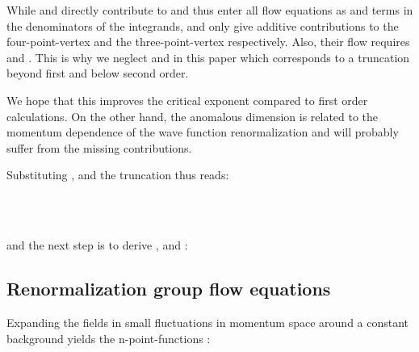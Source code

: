 \documentclass[a4paper,aps,prl,twocolumn,groupedaddress]{revtex4}
\begin{document}
\bigskip
\noindent
While \coordHE{} and \coordHE{} directly contribute to \coordHE{} and thus enter all flow 
equations as \coordHE{} and \coordHE{} terms in the denominators of the integrands, \coordHE{} and \coordHE{}
only give additive contributions to the four-point-vertex and the three-point-vertex respectively. 
Also, their flow requires \coordHE{} and \coordHE{}. 
This is why we neglect \coordHE{} and \coordHE{} in this paper which corresponds to a truncation 
beyond first and below second order.

\bigskip
\noindent
We hope that this improves the critical exponent \myHighlight{$\nu$}\coordHE{} compared to first order calculations.
On the other hand, the anomalous dimension \myHighlight{$\eta$}\coordHE{} is related to the momentum dependence of the
wave function renormalization and will probably suffer from the missing contributions.

\bigskip
\noindent
Substituting \coordHE{}, \coordHE{} and \coordHE{} the 
truncation thus reads:

\bigskip {}\coordHE{}\\
\coordHE{}\\
\coordHE{}

\bigskip
\noindent
and the next step is to derive \coordHE{}, \coordHE{} and \coordHE{}:





\newpage
\subsection*{Renormalization group flow equations}

\noindent
Expanding the fields \coordHE{} in small fluctuations
\coordHE{} in momentum space around a constant background 
\myHighlight{$\bar{\varphi}$}\coordHE{} yields the n-point-functions
\coordHE{}:
\end{document}

